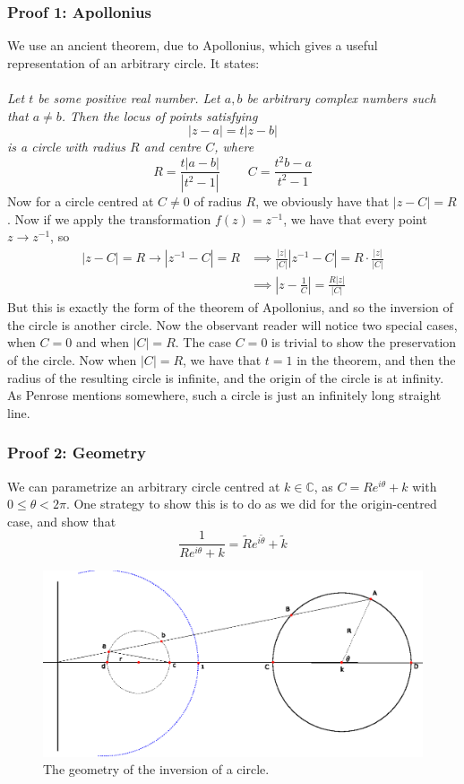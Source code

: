 \subsubsection*{Proof 1: Apollonius}
We use an ancient theorem, due to Apollonius, which gives a useful representation of an arbitrary circle. It states:\\ \\ \emph{Let $t$ be some positive real number. Let $a,b$ be arbitrary complex numbers such that $a\neq b$. Then the locus of points satisfying }
$$|z-a|=t|z-b|$$
\emph{is a circle with radius $R$ and centre $C$, where}
$$R=\frac{t|a-b|}{|t^2-1|} \ \ \ \ \ \ \ \ \ \ C=\frac{t^2 b -a}{t^2-1}$$
Now for a circle centred at $C\neq 0$ of radius $R$, we obviously have that $|z-C|=R$. Now if we apply the transformation $f(z)=z^{-1}$, we have that every point $z \to z^{-1}$, so 
\begin{align*}
|z-C|=R\to |z^{-1}-C|=R&\implies \frac{|z|}{|C|}\left|z^{-1}-C\right|=R\cdot \frac{|z|}{|C|}\\
&\implies\left|z-\frac{1}{C}\right|=\frac{R|z|}{|C|}
\end{align*}
But this is exactly the form of the theorem of Apollonius, and so the inversion of the circle is another circle. Now the observant reader will notice two special cases, when $C=0$ and when $|C|=R$. The case $C=0$ is trivial to show the preservation of the circle. Now when $|C|=R$, we have that $t=1$ in the theorem, and then the radius of the resulting circle is infinite, and the origin of the circle is at infinity. As Penrose mentions somewhere, such a circle is just an infinitely long straight line.

\subsubsection*{Proof 2: Geometry}

 We can parametrize an arbitrary circle centred at $k\in\mathbb{C}$, as $C=Re^{i\theta}+k$ with $0\leq \theta<2\pi$. One strategy to show this is to do as we did for the origin-centred case, and show that 
$$\frac{1}{Re^{i\theta}+k}=\tilde{R}e^{i\tilde{\theta}}+\tilde{k}$$
\begin{figure}[h!]
\includegraphics[scale=1.2]{chapters/images/inversion.eps}
\caption{The geometry of the inversion of a circle. }
\end{figure}  

